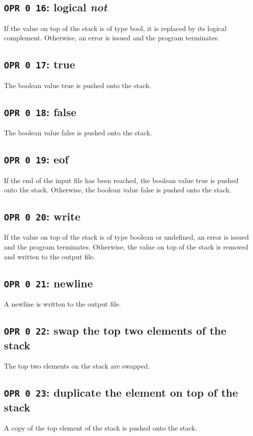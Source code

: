\documentclass[a4paper,10pt]{report}
\begin{document}
\subsection{\texttt{OPR 0 16}: logical \emph{not}}
If the value on top of the stack is of type bool, it is replaced by
its logical complement.  Otherwise, an error is issued and the program
terminates.

\subsection{\texttt{OPR 0 17}: true}
The boolean value true is pushed onto the stack.

\subsection{\texttt{OPR 0 18}: false}
The boolean value false is pushed onto the stack.

\subsection{\texttt{OPR 0 19}: eof}
If the end of the input file has been reached, the boolean value true
is pushed onto the stack.  Otherwise, the boolean value false is
pushed onto the stack.

\subsection{\texttt{OPR 0 20}: write}
If the value on top of the stack is of type boolean or undefined, an
error is issued and the program terminates.  Otherwise, the value on
top of the stack is removed and written to the output file.

\subsection{\texttt{OPR 0 21}: newline}
A newline is written to the output file.

\subsection{\texttt{OPR 0 22}: swap the top two elements of the stack}
The top two elements on the stack are swapped.

\subsection{\texttt{OPR 0 23}: duplicate the element on top of the stack}
A copy of the top element of the stack is pushed onto the stack.
\end{document}
